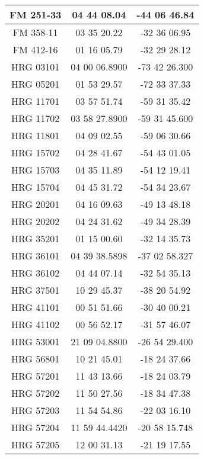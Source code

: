 \begin{apendicesenv}
\begin{longtable}{|c|c|c|}
            FM 251-33 & 04 44 08.04 & -44 06 46.84 \\ \hline
            FM 358-11 & 03 35 20.22 & -32 36 06.95 \\ \hline
            FM 412-16 & 01 16 05.79 & -32 29 28.12 \\ \hline
            HRG 03101 & 04 00 06.8900 & -73 42 26.300 \\ \hline
            HRG 05201 & 01 53 29.57 & -72 33 37.33 \\ \hline
            HRG 11701 & 03 57 51.74 & -59 31 35.42 \\ \hline
            HRG 11702 & 03 58 27.8900 & -59 31 45.600 \\ \hline
            HRG 11801 & 04 09 02.55 & -59 06 30.66 \\ \hline
            HRG 15702 & 04 28 41.67 & -54 43 01.05 \\ \hline
            HRG 15703 & 04 35 11.89 & -54 12 19.41 \\ \hline
            HRG 15704 & 04 45 31.72 & -54 34 23.67 \\ \hline
            HRG 20201 & 04 16 09.63 & -49 13 48.18 \\ \hline
            HRG 20202 & 04 24 31.62 & -49 34 28.39 \\ \hline
            HRG 35201 & 01 15 00.60 & -32 14 35.73 \\ \hline
            HRG 36101 & 04 39 38.5898 & -37 02 58.327 \\ \hline
            HRG 36102 & 04 44 07.14 & -32 54 35.13 \\ \hline
            HRG 37501 & 10 29 45.37 & -38 20 54.92 \\ \hline
            HRG 41101 & 00 51 51.66 & -30 40 00.21 \\ \hline
            HRG 41102 & 00 56 52.17 & -31 57 46.07 \\ \hline
            HRG 53001 & 21 09 04.8800 & -26 54 29.400 \\ \hline
            HRG 56801 & 10 21 45.01 & -18 24 37.66 \\ \hline
            HRG 57201 & 11 43 13.66 & -18 24 03.79 \\ \hline
            HRG 57202 & 11 50 27.56 & -18 34 47.38 \\ \hline
            HRG 57203 & 11 54 54.86 & -22 03 16.10 \\ \hline
            HRG 57204 & 11 59 44.4420 & -20 58 15.748 \\ \hline
            HRG 57205 & 12 00 31.13 & -21 19 17.55 \\ \hline

\end{longtable}
\end{apendicesenv}
